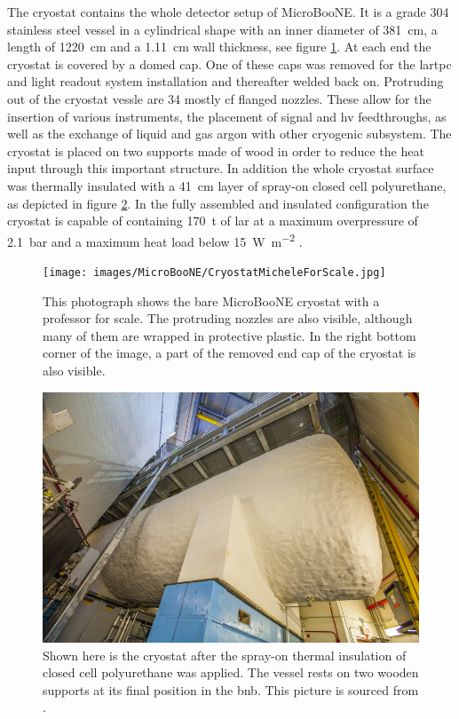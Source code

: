The cryostat contains the whole detector setup of MicroBooNE. It is a grade \num{304} stainless steel vessel in a cylindrical shape with an inner diameter of \SI{381}{\centi\metre}, a length of \SI{1220}{\centi\metre} and a \SI{1.11}{\centi\metre} wall thickness, see figure \ref{fig:BareCryostat}. At each end the cryostat is covered by a domed cap. One of these caps was removed for the \gls{lartpc} and light readout system installation and thereafter welded back on. Protruding out of the cryostat vessle are \num{34} mostly \gls{cf} flanged nozzles. These allow for the insertion of various instruments, the placement of signal and \gls{hv} feedthroughs, as well as the exchange of liquid and gas argon with other cryogenic subsystem. The cryostat is placed on two supports made of wood in order to reduce the heat input through this important structure. In addition the whole cryostat surface was thermally insulated with a \SI{41}{\centi\metre} layer of spray-on closed cell polyurethane, as depicted in figure \ref{fig:InsulatedCryostat}. In the fully assembled and insulated configuration the cryostat is capable of containing \SI{170}{\tonne} of \gls{lar} at a maximum overpressure of \SI{2.1}{\bar} and a maximum heat load below \SI{15}{\watt\per\square\metre} \cite{MicroBooNEDetector}.
\begin{figure}[htbp]
    \centering
    \texttt{[image: images/MicroBooNE/CryostatMicheleForScale.jpg]}
    \caption[Bare MicroBooNE Cryostat]{This photograph shows the bare MicroBooNE cryostat with a professor for scale. The protruding nozzles are also visible, although many of them are wrapped in protective plastic. In the right bottom corner of the image, a part of the removed end cap of the cryostat is also visible.}
    \label{fig:BareCryostat}
\end{figure}
\begin{figure}[htbp]
    \centering
    \includegraphics[width=1.0\textwidth]{images/MicroBooNE/CryostatInsulated.jpg}
    \caption[Thermally Insulated MicroBooNE Cryostat]{Shown here is the cryostat after the spray-on thermal insulation of closed cell polyurethane was applied. The vessel rests on two wooden supports at its final position in the \gls{bnb}. This picture is sourced from \cite{MicroBooNEDetector}.}
    \label{fig:InsulatedCryostat}
\end{figure}

